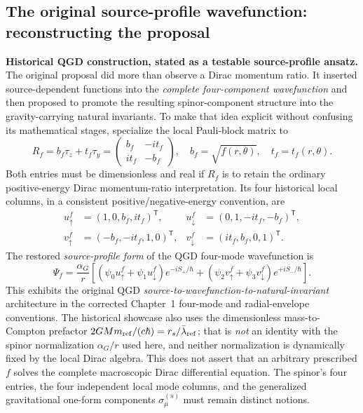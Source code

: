 \documentclass[11pt,a4paper]{article}
\begin{document}
\subsection{The original source-profile wavefunction: reconstructing the proposal}\label{sec:qgd065-original-profile}
\noindent\textbf{Historical QGD construction, stated as a testable source-profile ansatz.}
The original proposal did more than observe a Dirac momentum ratio.  It inserted
source-dependent functions into the \emph{complete four-component wavefunction}
and then proposed to promote the resulting spinor-component structure into the
gravity-carrying natural invariants.  To make that idea explicit without confusing
its mathematical stages, specialize the local Pauli-block matrix to
\begin{equation}\label{eq:qgd065-profile-matrix}
\boxed{R_f=b_f\tau_z+t_f\tau_y
=\begin{pmatrix}b_f&-it_f\\it_f&-b_f\end{pmatrix},\quad
b_f=\sqrt{f(r,\theta)},\quad t_f=t_f(r,\theta).}
\end{equation}
Both entries must be dimensionless and real if $R_f$ is to retain the
ordinary positive-energy Dirac momentum-ratio interpretation.  Its four
historical local columns, in a consistent positive/negative-energy convention,
are
\begin{equation}\label{eq:qgd065-profile-columns}
\begin{aligned}
 u_\uparrow^{f}&=(1,0,b_f,it_f)^{\mathsf T},&
 u_\downarrow^{f}&=(0,1,-it_f,-b_f)^{\mathsf T},\\
 v_\uparrow^{f}&=(-b_f,-it_f,1,0)^{\mathsf T},&
 v_\downarrow^{f}&=(it_f,b_f,0,1)^{\mathsf T}.
\end{aligned}
\end{equation}
The restored \emph{source-profile form} of the QGD four-mode wavefunction is
\begin{equation}\label{eq:qgd065-profile-wave}
\boxed{\displaystyle
\Psi_f=\frac{\alpha_G}{r}\left[
 (\psi_0u_\uparrow^f+\psi_1u_\downarrow^f)e^{-iS_+/\hbar}
 +(\psi_2v_\uparrow^f+\psi_3v_\downarrow^f)e^{+iS_-/\hbar}
\right].}
\end{equation}
This exhibits the original QGD \emph{source-to-wavefunction-to-natural-invariant}
architecture in the corrected Chapter~1 four-mode and radial-envelope
conventions.  The historical showcase also uses the dimensionless
mass-to-Compton prefactor $2GMm_{\rm ref}/(c\hbar)=r_s/\bar\lambda_{\rm ref}$;
that is \emph{not} an identity with the spinor normalization
$\alpha_G/r$ used here, and neither normalization is dynamically
fixed by the local Dirac algebra.  This does not assert that an
arbitrary prescribed $f$ solves the complete
macroscopic Dirac differential equation.  The spinor's four entries, the
four independent local mode columns, and the generalized gravitational
one-form components $\sigma_\mu^{(s)}$ must remain distinct notions.
\end{document}
